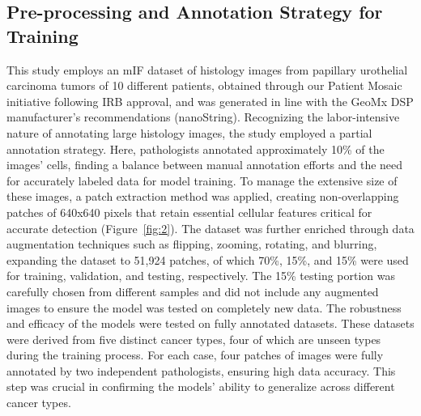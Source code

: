 \documentclass{midl} %
\begin{document}
\subsection{Pre-processing and Annotation Strategy for Training}
This study employs an mIF dataset of histology images from papillary urothelial carcinoma tumors of 10 different patients, obtained through our Patient Mosaic initiative following IRB approval, and was generated in line with the GeoMx DSP manufacturer's recommendations (nanoString). Recognizing the labor-intensive nature of annotating large histology images, the study employed a partial annotation strategy. Here,  pathologists annotated approximately 10\% of the images' cells, finding a balance between manual annotation efforts and the need for accurately labeled data for model training. To manage the extensive size of these images, a patch extraction method was applied, creating non-overlapping patches of 640x640 pixels that retain essential cellular features critical for accurate detection (Figure~\ref{fig:2}). The dataset was further enriched through data augmentation techniques such as flipping, zooming, rotating, and blurring, expanding the dataset to 51,924 patches, of which 70\%, 15\%, and 15\% were used for training, validation, and testing, respectively. The 15\% testing portion was carefully chosen from different samples and did not include any augmented images to ensure the model was tested on completely new data. The robustness and efficacy of the models were tested on fully annotated datasets. These datasets were derived from five distinct cancer types, four of which are unseen types during the training process. For each case, four patches of images were fully annotated by two independent pathologists, ensuring high data accuracy. This step was crucial in confirming the models' ability to generalize across different cancer types.
\end{document}
